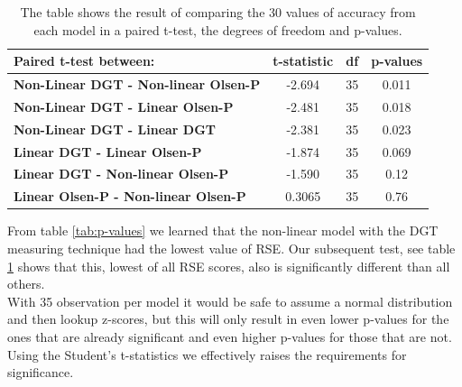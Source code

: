 \documentclass{article}
\begin{document}
\begin{table}[H]
\begin{tabular}{lccc}\toprule[1.5pt]
\textbf{Paired t-test between:}                          & \multicolumn{1}{l}{\textbf{t-statistic}} & \multicolumn{1}{l}{\textbf{df}} & \multicolumn{1}{l}{\textbf{p-values}} \\\midrule
\textbf{Non-Linear DGT - Non-linear Olsen-P} & -2.694                                   & 35                              & 0.011                                 \\\midrule
\textbf{Non-Linear DGT - Linear Olsen-P}     & -2.481                                   & 35                              & 0.018                                 \\\midrule
\textbf{Non-Linear DGT - Linear DGT}         & -2.381                                   & 35                              & 0.023                                 \\\midrule
\textbf{Linear DGT - Linear Olsen-P}         & -1.874                                   & 35                              & 0.069                                 \\\midrule
\textbf{Linear DGT - Non-linear Olsen-P}     & -1.590                                   & 35                              & 0.12                                  \\\midrule
\textbf{Linear Olsen-P - Non-linear Olsen-P} & 0.3065                                   & 35                              & 0.76                      \\
\bottomrule[1.25pt]           
\end{tabular}
\caption{The table shows the result of comparing the 30 values of accuracy from each model in a paired t-test, the degrees of freedom and p-values.}
\label{tab:BAPcompare}
\end{table}


From table \ref{tab:p-values} we learned that the non-linear model with the DGT measuring technique had the lowest value of RSE. Our subsequent test, see table \ref{tab:BAPcompare} shows that this, lowest of all RSE scores, also is significantly different than all others. \\
With 35 observation per model it would be safe to assume a normal distribution and then lookup z-scores, but this will only result in even lower p-values for the ones that are already significant and even higher p-values for those that are not. Using the Student's t-statistics we effectively raises the requirements for significance.	
\end{document}
